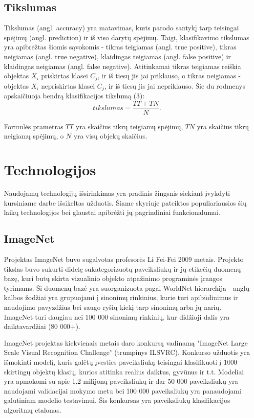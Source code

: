 \documentclass{VUMIFPSkursinis}
\begin{document}
\subsection{Tikslumas}
Tikslumas (angl. accuracy) yra matavimas, kuris parodo santykį tarp teisingai spėjimų (angl. prediction) ir iš viso darytų spėjimų.
Taigi, klasifikavimo tikslumas yra apibrėžtas šiomis sąvokomis - tikras teigiamas (angl. true positive), tikras neigiamas (angl. true negative), klaidingas teigiamas (angl. false positive) ir klaidingas neigiamas (angl. false negative). Atitinkamai tikras teigiamas reiškia objektas \(X_{i}\) priskirtas klasei \(C_{j}\), ir iš tiesų jis jai priklauso, o tikras neigiamas - objektas \(X_{i}\) nepriskirtas klasei \(C_{j}\), ir iš tiesų jis jai nepriklauso. Šie du rodmenys apskaičiuoja bendrą klasifikacijos tikslumą (3):
\begin{equation}
tikslumas = \frac{TT + TN}{N}.
\end{equation}

Formulės prametras \(TT\) yra skaičius tikrų teigiamų spėjimų, \(TN\) yra skaičius tikrų neigiamų spėjimų, o \(N\) yra visų objekų skaičius.

\section{Technologijos}
Naudojamų technologijų išsirinkimas yra pradinis žingsnis siekiant įvykdyti kursiniame darbe išsikeltas užduotis. Šiame skyriuje pateiktos populiariausios šių laikų technologijos 
bei glaustai apibrėžti jų pagrindiniai funkcionalumai.

\subsection{ImageNet}
Projektas ImageNet buvo sugalvotas profesorės Li Fei-Fei 2009 metais. Projekto tikslas buvo sukurti didelę sukategorizuotų paveiksliukų ir jų etikečių duomenų bazę, 
kuri butų skirta vizualinio objekto atpažinimo programinės įrangos tyrimams. Ši duomenų bazė yra suorganizuota pagal WorldNet hierarchija - anglų kalbos žodžiai 
yra grupuojami į sinonimų rinkinius, kurie turi apibūdinimus ir naudojimo pavyzdžius bei saugo ryšių kiekį tarp sinonimų arba jų narių. ImageNet turi daugiau nei 
100 000 sinonimų rinkinių, kur didžioji dalis yra daiktavardžiai (80 000+). 

ImageNet projektas kiekvienais metais daro konkursą vadinamą "ImageNet Large Scale Visual Recognition Challenge" (trumpinys ILSVRC). Konkurso užduotis yra 
išmokinti modelį, kuris galėtų įvesties paveiksliuką teisingai klasifikuoti į 1000 skirtingų objektų klasių, kurios atitinka realius daiktus, gyvūnus ir t.t. Modeliai 
yra apmokomi su apie 1.2 milijonų paveiksliukų ir dar 50 000 paveiksliukų yra naudojami validacijai mokymo metu bei 100 000 paveiksliukų yra panaudojami galutiniam 
modelio testavimui. Šis konkursas yra paveiksliukų klasifikacijos algoritmų etalonas.
\end{document}

